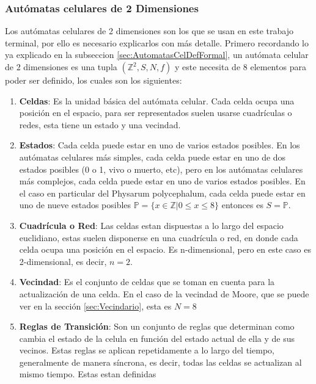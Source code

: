 \subsubsection{Aut\'omatas celulares de 2 Dimensiones}
\label{sec:AutomatasCel2D}

    Los aut\'omatas celulares de 2 dimensiones son los que se usan en este trabajo terminal, por ello es necesario
        explicarlos con m\'as detalle. Primero recordando lo ya explicado en la subseccion \ref{sec:AutomatasCelDefFormal}, un aut\'omata
        celular de 2 dimensiones es una tupla $({\mathbb{Z}^{2}},S,N,f)$ y este 
        necesita de 8 elementos para poder ser definido, los cuales son los siguientes:         
    \begin{enumerate}
        \item \textbf{Celdas}: Es la unidad b\'asica del aut\'omata celular. Cada celda ocupa una posici\'on en el espacio, 
            para ser representados suelen usarse cuadr\'iculas o redes, esta tiene un estado y una vecindad.
        \item \textbf{Estados}: Cada celda puede estar en uno de varios estados posibles. En los aut\'omatas celulares
            m\'as simples, cada celda puede estar en uno de dos estados posibles (0 o 1, vivo o muerto, etc), pero en los 
            aut\'omatas celulares m\'as complejos, cada celda puede estar en uno de varios estados posibles. En el caso 
            en particular del Physarum polycephalum, cada celda puede estar en uno de nueve estados posibles 
            $\mathbb{P} = \{x \in \mathbb{Z}| 0 \leq x \leq 8\}$ entonces es $S = \mathbb{P}$.
        \item \textbf{Cuadr\'icula o Red}: Las celdas estan dispuestas a lo largo del espacio euclidiano, estas 
            suelen disponerse en una cuadr\'icula o red, en donde cada celda ocupa una posici\'on en el espacio. Es
            n-dimensional, pero en este caso es 2-dimensional, es decir, $n = 2$.
        \item \textbf{Vecindad}: Es el conjunto de celdas que se toman en cuenta para la actualizaci\'on de una celda. En el caso de
            la vecindad de Moore, que se puede ver en la secci\'on \ref{sec:Vecindario}, esta es $N = 8$
        \item \textbf{Reglas de Transici\'on}: Son un conjunto de reglas que determinan como cambia el estado de la celula en 
            funci\'on del estado actual de ella y de sus vecinos. Estas reglas se aplican repetidamente a lo largo del tiempo,
            generalmente de manera s\'incrona, es decir, todas las celdas se actualizan al mismo tiempo. Estas estan definidas 

\end{enumerate}
